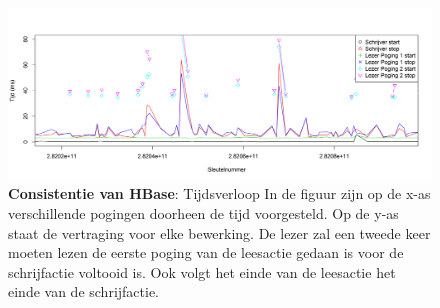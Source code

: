 \begin{figure}[b] 
	\centering
	\includegraphics[width=\textwidth]{img/Observaties/HBase/consistency-plot-R-1-insertRawData-5}

	\caption{\textbf{Consistentie van HBase}: Tijdsverloop \newline
 	In de figuur zijn op de x-as verschillende pogingen doorheen de tijd voorgesteld. Op de y-as staat de vertraging voor elke bewerking. De lezer zal een tweede keer moeten lezen de eerste poging van de leesactie gedaan is voor de schrijfactie voltooid is. Ook volgt het einde van de leesactie het einde van de schrijfactie. }
	\label{fig:consistentie-hbase-tijdschaal-lezer-1}
\end{figure}

